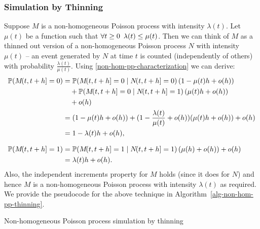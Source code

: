 \documentclass[report.tex]{subfiles}
\begin{document}
\subsubsection{Simulation by Thinning}

Suppose $M$ is a non-homogeneous Poisson process with intensity $\lambda(t)$.
Let $\mu(t)$ be a function such that
$\forall t \geq 0 \enskip \lambda(t) \leq \mu(t)$. Then we can think of
$M$ as a thinned out version of a non-homogeneous Poisson process $N$ with
intensity $\mu(t)$ --
an event generated by $N$ at time $t$ is counted (independently of others)
with probability $\frac{\lambda(t)}{\mu(t)}$.
Using \ref{non-hom-pp-characterization} we can derive:
\begin{equation*}
\begin{split}
\pr{\countingProcess{M}{t}{t+h} = 0}
&= \cpr{\countingProcess{M}{t}{t+h} = 0}{\countingProcess{N}{t}{t+h} = 0}
   (1 - \mu(t)h + o(h)) \\
   &\quad+ \cpr{\countingProcess{M}{t}{t+h} = 0}{\countingProcess{N}{t}{t+h} = 1}
   (\mu(t)h + o(h)) \\
   &\quad+ o(h) \\
&= (1 - \mu(t)h + o(h)) + (1 - \frac{\lambda(t)}{\mu(t)} + o(h))
   (\mu(t)h + o(h)) + o(h) \\
   &= 1 - \lambda(t)h + o(h), \\[0.75em]
\pr{\countingProcess{M}{t}{t+h} = 1}
&= \cpr{\countingProcess{M}{t}{t+h} = 1}{\countingProcess{N}{t}{t+h} = 1}
   (\mu(h) + o(h)) + o(h) \\
&= \lambda(t)h + o(h).
\end{split}
\end{equation*}
Also, the independent increments property for $M$ holds (since it does for $N$) and
hence $M$ is a non-homogeneous Poisson process with intensity $\lambda(t)$ as required.
We provide the pseudocode for the above technique in
Algorithm~\ref{alg-non-hom-pp-thinning}.

\begin{algorithm}
\caption{Non-homogeneous Poisson process simulation by thinning}
\label{alg-non-hom-pp-thinning}
\begin{algorithmic}
    \EndWhile
  \EndFor
\end{algorithmic}
\end{algorithm}
\end{document}
